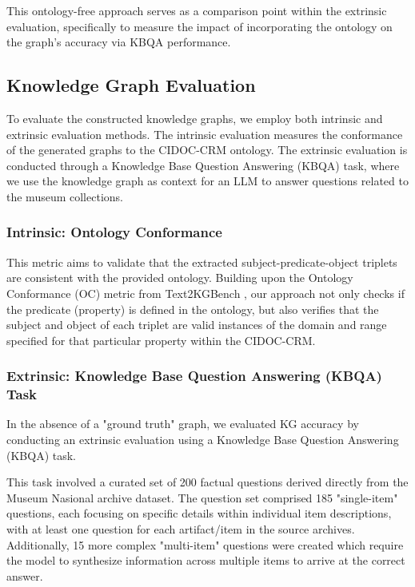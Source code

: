\documentclass[a4, conference]{IEEEtran}
\begin{document}
This ontology-free approach serves as a comparison point within the extrinsic evaluation, specifically to measure the impact of incorporating the ontology on the graph's accuracy via KBQA performance.

\subsection{Knowledge Graph Evaluation}

To evaluate the constructed knowledge graphs, we employ both intrinsic and extrinsic evaluation methods. The intrinsic evaluation measures the conformance of the generated graphs to the CIDOC-CRM ontology. The extrinsic evaluation is conducted through a Knowledge Base Question Answering (KBQA) task, where we use the knowledge graph as context for an LLM to answer questions related to the museum collections.

\subsubsection{Intrinsic: Ontology Conformance}

This metric aims to validate that the extracted subject-predicate-object triplets are consistent with the provided ontology. Building upon the Ontology Conformance (OC) metric from Text2KGBench \cite{mihindukulasooriya2023text2kgbench}, our approach not only checks if the predicate (property) is defined in the ontology, but also verifies that the subject and object of each triplet are valid instances of the domain and range specified for that particular property within the CIDOC-CRM.

\subsubsection{Extrinsic: Knowledge Base Question Answering (KBQA) Task}

In the absence of a "ground truth" graph, we evaluated KG accuracy by conducting an extrinsic evaluation using a Knowledge Base Question Answering (KBQA) task.

This task involved a curated set of 200 factual questions derived directly from the Museum Nasional archive dataset. The question set comprised 185 "single-item" questions, each focusing on specific details within individual item descriptions, with at least one question for each artifact/item in the source archives. Additionally, 15 more complex "multi-item" questions were created which require the model to synthesize information across multiple items to arrive at the correct answer.
\end{document}
